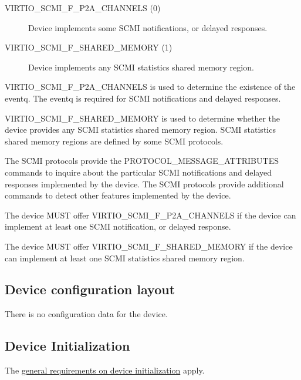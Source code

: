 \begin{description}
\item[VIRTIO_SCMI_F_P2A_CHANNELS (0)] Device implements some SCMI
notifications, or delayed responses.
\item[VIRTIO_SCMI_F_SHARED_MEMORY (1)] Device implements any SCMI
statistics shared memory region.
\end{description}

VIRTIO_SCMI_F_P2A_CHANNELS is used to determine the existence of the
eventq. The eventq is required for SCMI notifications and delayed
responses.

VIRTIO_SCMI_F_SHARED_MEMORY is used to determine whether the device
provides any SCMI statistics shared memory region. SCMI statistics
shared memory regions are defined by some SCMI protocols.

The SCMI protocols provide the PROTOCOL_MESSAGE_ATTRIBUTES commands to
inquire about the particular SCMI notifications and delayed responses
implemented by the device. The SCMI protocols provide additional
commands to detect other features implemented by the device.


The device MUST offer VIRTIO_SCMI_F_P2A_CHANNELS if the device can
implement at least one SCMI notification, or delayed response.

The device MUST offer VIRTIO_SCMI_F_SHARED_MEMORY if the device can
implement at least one SCMI statistics shared memory region.

\subsection{Device configuration layout}\label{sec:Device Types / SCMI Device / Device configuration layout}

There is no configuration data for the device.

\subsection{Device Initialization}\label{sec:Device Types / SCMI Device / Device Initialization}

The
\hyperref[sec:General Initialization And Device Operation / Device Initialization]{general
requirements on device initialization} apply.

